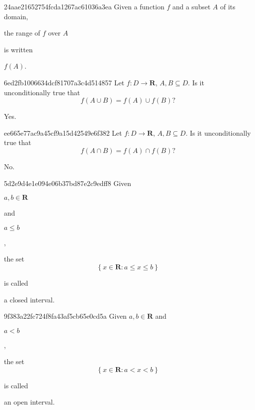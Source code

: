 \begin{note}{24aae21652754fcda1267ac61036a3ea}
    Given a function \({ f }\) and a subset \({ A }\) of its domain, \begin{icloze}{2}the range of \({ f }\) over \({ A }\)\end{icloze} is written \begin{icloze}{1}\({ f(A) }\).\end{icloze}
\end{note}

\begin{note}{6ed2fb1006634dcf81707a3c4d514857}
    Let \({ f : D \to \mathbf{R} }\),\: \({ A, B \subseteq D }\).
    Is it unconditionally true that
    \[
        f(A \cup B) = f(A) \cup f(B)?
    \]

    \begin{cloze}{1}
        Yes.
    \end{cloze}
\end{note}

\begin{note}{ee665e77ac9a45cf9a15d42549e6f382}
    Let \({ f : D \to \mathbf{R} }\),\: \({ A, B \subseteq D }\).
    Is it unconditionally true that
    \[
        f(A \cap B) = f(A) \cap f(B)?
    \]

    \begin{cloze}{1}
        No.
    \end{cloze}
\end{note}

\begin{note}{5d2e9d4e1e094e06b37bd87e2c9edff8}
    Given \begin{icloze}{4}\({ a, b \in \mathbf{R} }\)\end{icloze} and \begin{icloze}{3}\({ a \leq b }\)\end{icloze},
    \begin{icloze}{2}
        the set
        \[
            \left\{ x \in \mathbf{R} : a \leq x \leq b \right\}
        \]
    \end{icloze}
    is called \begin{icloze}{1}a closed interval.\end{icloze}
\end{note}

\begin{note}{9f383a22fc724f8fa43af5cb65e0cd5a}
    Given \({ a, b \in \mathbf{R} }\) and \begin{icloze}{3}\({ a < b }\)\end{icloze},
    \begin{icloze}{2}
        the set
        \[
            \left\{ x \in \mathbf{R} : a < x < b \right\}
        \]
    \end{icloze}
    is called \begin{icloze}{1}an open interval.\end{icloze}
\end{note}

